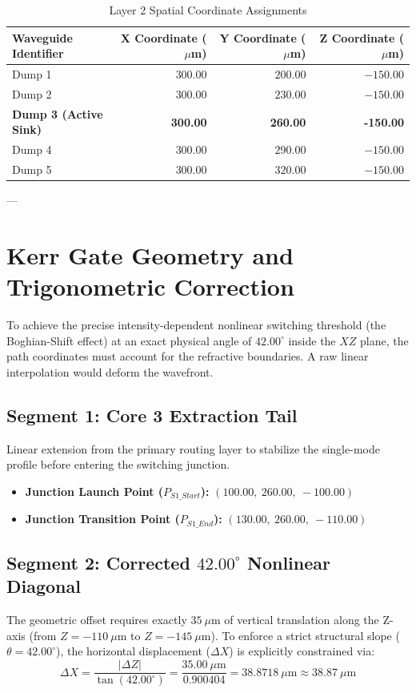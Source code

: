 \documentclass[11pt,a4paper]{article}
\begin{document}
\begin{table}[h!]
\centering
\caption{Layer 2 Spatial Coordinate Assignments}
\vspace{0.2cm}
\begin{tabular}{lrrr}
\toprule
\textbf{Waveguide Identifier} & \textbf{X Coordinate ($\mu$m)} & \textbf{Y Coordinate ($\mu$m)} & \textbf{Z Coordinate ($\mu$m)} \\
\midrule
Dump 1 & $300.00$ & $200.00$ & $-150.00$ \\
Dump 2 & $300.00$ & $230.00$ & $-150.00$ \\
\textbf{Dump 3 (Active Sink)} & \textbf{300.00} & \textbf{260.00} & \textbf{-150.00} \\
Dump 4 & $300.00$ & $290.00$ & $-150.00$ \\
Dump 5 & $300.00$ & $320.00$ & $-150.00$ \\
\bottomrule
\end{tabular}
\end{table}

---

\section{Kerr Gate Geometry and Trigonometric Correction}

To achieve the precise intensity-dependent nonlinear switching threshold (the Boghian-Shift effect) at an exact physical angle of $42.00^\circ$ inside the $XZ$ plane, the path coordinates must account for the refractive boundaries. A raw linear interpolation would deform the wavefront. 

\subsection{Segment 1: Core 3 Extraction Tail}
Linear extension from the primary routing layer to stabilize the single-mode profile before entering the switching junction.
\begin{itemize}
    \item \textbf{Junction Launch Point ($P_{S1\_Start}$):} $(100.00,\ 260.00,\ -100.00)$
    \item \textbf{Junction Transition Point ($P_{S1\_End}$):} $(130.00,\ 260.00,\ -110.00)$
\end{itemize}

\subsection{Segment 2: Corrected $42.00^\circ$ Nonlinear Diagonal}
The geometric offset requires exactly $35\ \mu$m of vertical translation along the Z-axis (from $Z = -110\ \mu$m to $Z = -145\ \mu$m). To enforce a strict structural slope ($\theta = 42.00^\circ$), the horizontal displacement ($\Delta X$) is explicitly constrained via:
\begin{equation}
\Delta X = \frac{|\Delta Z|}{\tan(42.00^\circ)} = \frac{35.00\ \mu\text{m}}{0.900404} = 38.8718\ \mu\text{m} \approx 38.87\ \mu\text{m}
\end{equation}
\end{document}
